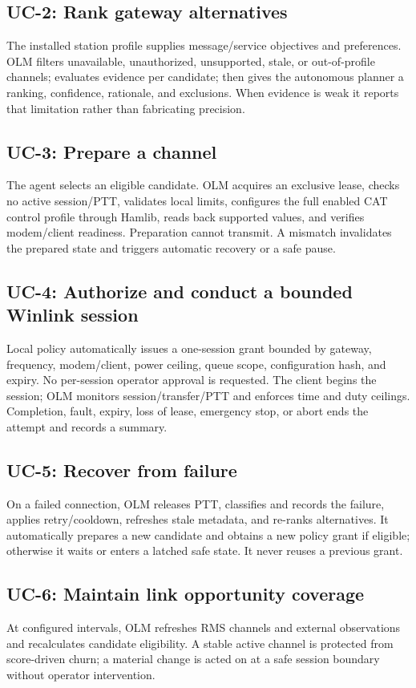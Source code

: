 \documentclass[11pt,a4paper]{article}
\begin{document}
\subsection{UC-2: Rank gateway alternatives}
The installed station profile supplies message/service objectives and preferences. OLM filters unavailable, unauthorized, unsupported, stale, or out-of-profile channels; evaluates evidence per candidate; then gives the autonomous planner a ranking, confidence, rationale, and exclusions. When evidence is weak it reports that limitation rather than fabricating precision.

\subsection{UC-3: Prepare a channel}
The agent selects an eligible candidate. OLM acquires an exclusive lease, checks no active session/PTT, validates local limits, configures the full enabled CAT control profile through Hamlib, reads back supported values, and verifies modem/client readiness. Preparation cannot transmit. A mismatch invalidates the prepared state and triggers automatic recovery or a safe pause.

\subsection{UC-4: Authorize and conduct a bounded Winlink session}
Local policy automatically issues a one-session grant bounded by gateway, frequency, modem/client, power ceiling, queue scope, configuration hash, and expiry. No per-session operator approval is requested. The client begins the session; OLM monitors session/transfer/PTT and enforces time and duty ceilings. Completion, fault, expiry, loss of lease, emergency stop, or abort ends the attempt and records a summary.

\subsection{UC-5: Recover from failure}
On a failed connection, OLM releases PTT, classifies and records the failure, applies retry/cooldown, refreshes stale metadata, and re-ranks alternatives. It automatically prepares a new candidate and obtains a new policy grant if eligible; otherwise it waits or enters a latched safe state. It never reuses a previous grant.

\subsection{UC-6: Maintain link opportunity coverage}
At configured intervals, OLM refreshes RMS channels and external observations and recalculates candidate eligibility. A stable active channel is protected from score-driven churn; a material change is acted on at a safe session boundary without operator intervention.
\end{document}
